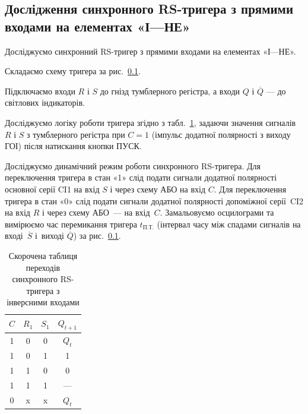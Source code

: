 \documentclass[a4paper,oneside,DIV=10,12pt]{scrartcl}
\newcommand\barneg[1]{\overline{#1}}
\begin{document}
		\subsection{Дослідження синхронного RS-тригера з прямими входами на елементах «І—НЕ»}
			Досліджуємо синхронний RS-тригер з прямими входами на елементах «І—НЕ».
			\begin{steps}
				\item Складаємо схему тригера за рис.~\ref{}.
				
				\item Підключаємо входи $R$ і $S$ до гнізд тумблерного регістра, а входи $Q$ і $\barneg{Q}$ — до світлових індикаторів.
				
				\item Досліджуємо логіку роботи тригера згідно з табл.~\ref{tab:flipflop-rs-excitation-table}, задаючи значення сигналів $R$ і $S$ з тумблерного регістра при $C = 1$ (імпульс додатної полярності з виходу ГОІ) після натискання кнопки ПУСК.
				
				\item Досліджуємо динамічний режим роботи синхронного RS-тригера. Для переключення тригера в стан «1» слід подати сигнали додатної полярності основної серії CI1 на вхід $S$ і через схему АБО на вхід $C$. Для переключення тригера в стан «0» слід подати сигнали додатної полярності допоміжної серії~CI2 на вхід $R$ і через схему АБО~— на вхід~$C$. Замальовуємо осцилограми та вимірюємо час перемикання тригера $t_{\text{П.Т.}}$ (інтервал часу між спадами сигналів на вході~$\barneg{S}$ і~виході $\barneg{Q}$) за рис.~\ref{}.
			\end{steps}
			
			\begin{table}[!htbp]
			\centering
				\begin{tabular}{cccc}
					\toprule
						$C$ & $R_1$ & $S_1$ & $Q_{t+1}$\\
					\midrule
						 1  & 0     & 0     & $Q_t$\\
						 1  & 0     & 1     & 1\\
						 1  & 1     & 0     & 0\\
						 1  & 1     & 1     & —\\
						 0  & x     & x     & $Q_t$\\
					\bottomrule
				\end{tabular}
			\caption{Скорочена таблиця переходів синхронного RS-тригера з інверсними входами}
			\label{tab:flipflop-rs-excitation-table}
			\end{table}
		
\end{document}
